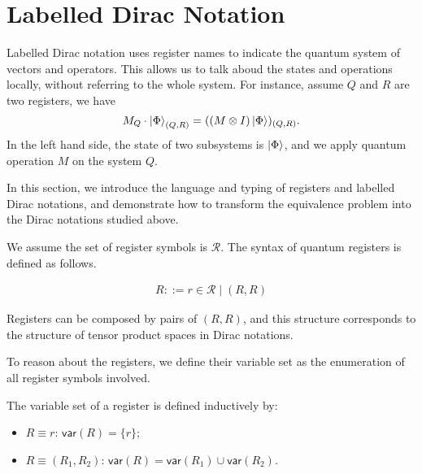 


\newcommand{\var}{\mathsf{var}}
\newcommand{\reg}{\mathsf{Reg}}
\newcommand{\DType}{\mathcal{D}}
\newcommand{\cR}{\mathcal{R}}
\newcommand{\cN}{\mathcal{N}}
\newcommand{\tD}{\tilde{D}}
\newcommand{\te}{\tilde{e}}
\newcommand{\tT}{\tilde{T}}
\newcommand{\tADD}{\widetilde{ADD}}
\newcommand{\bU}{\mathbf{U}}
\newcommand{\<}{\langle}
\newcommand{\simp}{\mathsf{Simp}}
\newcommand{\List}{\mathsf{list}}
\renewcommand{\>}{\rangle}


\section{Labelled Dirac Notation}

Labelled Dirac notation uses register names to indicate the quantum system of vectors and operators. This allows us to talk aboud the states and operations locally, without referring to the whole system. For instance, assume $Q$ and $R$ are two registers, we have
\[
    M_Q \cdot \ket{\Phi}_{(Q, R)} = ((M \otimes I) \ket{\Phi})_{(Q, R)}.
\]
In the left hand side, the state of two subsystems is $\ket{\Phi}$, and we apply quantum operation $M$ on the system $Q$.


In this section, we introduce the language and typing of registers and labelled Dirac notations, and demonstrate how to transform the equivalence problem into the Dirac notations studied above.

We assume the set of register symbols is $\cR$. The syntax of quantum registers is defined as follows.
\begin{definition}
  \begin{align*}
    R ::= r\in\cR \mid (R, R)
  \end{align*}
\end{definition}

Registers can be composed by pairs of $(R, R)$, and this structure corresponds to the structure of tensor product spaces in Dirac notations.

To reason about the registers, we define their variable set as the enumeration of all register symbols involved.

\begin{definition}
The variable set of a register is defined inductively by:
\begin{itemize}
    \item $R\equiv r$: $\var(R) = \{r\}$;
    \item $R\equiv (R_1,R_2)$: $\var(R) = \var(R_1) \cup\var(R_2)$.
\end{itemize}
\end{definition}

